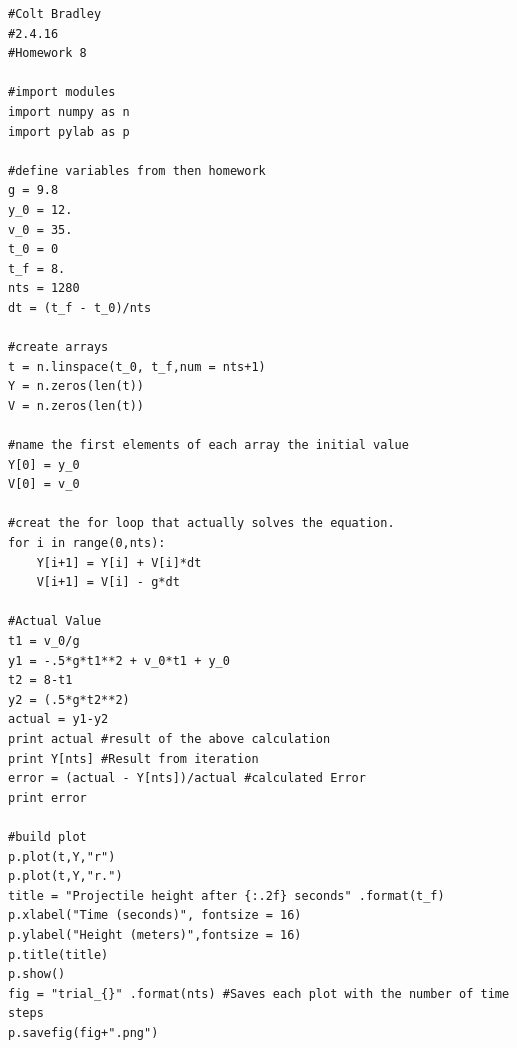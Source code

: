 \documentclass[11pt]{article}
\begin{document}
\begin{verbatim}
#Colt Bradley
#2.4.16
#Homework 8

#import modules
import numpy as n
import pylab as p

#define variables from then homework
g = 9.8
y_0 = 12.
v_0 = 35.
t_0 = 0
t_f = 8.
nts = 1280
dt = (t_f - t_0)/nts

#create arrays
t = n.linspace(t_0, t_f,num = nts+1)
Y = n.zeros(len(t))
V = n.zeros(len(t))

#name the first elements of each array the initial value
Y[0] = y_0
V[0] = v_0

#creat the for loop that actually solves the equation. 
for i in range(0,nts):
    Y[i+1] = Y[i] + V[i]*dt
    V[i+1] = V[i] - g*dt

#Actual Value
t1 = v_0/g
y1 = -.5*g*t1**2 + v_0*t1 + y_0
t2 = 8-t1
y2 = (.5*g*t2**2)
actual = y1-y2
print actual #result of the above calculation
print Y[nts] #Result from iteration
error = (actual - Y[nts])/actual #calculated Error
print error

#build plot
p.plot(t,Y,"r")
p.plot(t,Y,"r.")
title = "Projectile height after {:.2f} seconds" .format(t_f)
p.xlabel("Time (seconds)", fontsize = 16)
p.ylabel("Height (meters)",fontsize = 16)
p.title(title)
p.show()
fig = "trial_{}" .format(nts) #Saves each plot with the number of time steps
p.savefig(fig+".png")
\end{verbatim}
\end{document}
